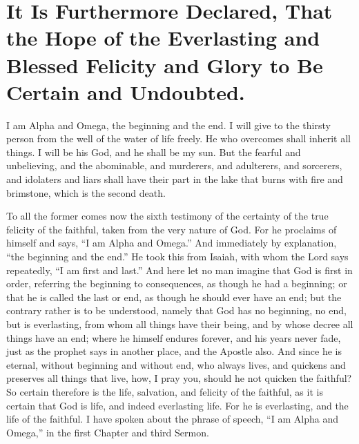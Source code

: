 \chapter[Sermon 92. It Is Furthermore Declared, That the Hope of the Everlasting and Blessed Felicity and Glory to Be Certain and Undoubted.]{It Is Furthermore Declared, That the Hope of the Everlasting and Blessed Felicity and Glory to Be Certain and Undoubted.}
\label{sermon:092}

I am Alpha and Omega, the beginning and the end. I will give to the thirsty person from the well of the water of life freely. He who overcomes shall inherit all things. I will be his God, and he shall be my sun. But the fearful and unbelieving, and the abominable, and murderers, and adulterers, and sorcerers, and idolaters and liars shall have their part in the lake that burns with fire and brimstone, which is the second death.

To all the former comes now the sixth testimony of the certainty of the true felicity of the faithful, taken from the very nature of God. For he proclaims of himself and says, “I am Alpha and Omega.” And immediately by explanation, “the beginning and the end.” He took this from Isaiah, with whom the Lord says repeatedly, “I am first and last.” And here let no man imagine that God is first in order, referring the beginning to consequences, as though he had a beginning; or that he is called the last or end, as though he should ever have an end; but the contrary rather is to be understood, namely that God has no beginning, no end, but is everlasting, from whom all things have their being, and by whose decree all things have an end; where he himself endures forever, and his years never fade, just as the prophet says in another place, and the Apostle also. And since he is eternal, without beginning and without end, who always lives, and quickens and preserves all things that live, how, I pray you, should he not quicken the faithful? So certain therefore is the life, salvation, and felicity of the faithful, as it is certain that God is life, and indeed everlasting life. For he is everlasting, and the life of the faithful. I have spoken about the phrase of speech, “I am Alpha and Omega,” in the first Chapter and third Sermon.

